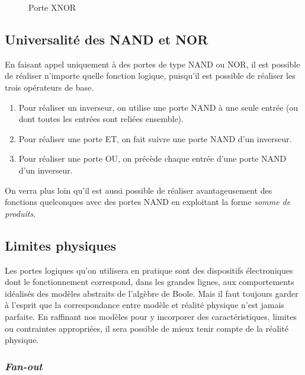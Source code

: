 \documentclass[11pt]{article}
\begin{document}
\begin{figure}[htbp]
\centering

\caption{\label{fig:org3faaf4b}Porte XNOR}
\end{figure}

\subsection{Universalité des NAND et NOR}
\label{sec:org5e187c2}

En faisant appel uniquement à des portes de type NAND ou NOR, il est
possible de réaliser n'importe quelle fonction logique, puisqu'il est
possible de réaliser les trois opérateurs de base.

\begin{enumerate}
\item Pour réaliser un inverseur, on utilise une porte NAND à une seule
entrée (ou dont toutes les entrées sont reliées ensemble).
\item Pour réaliser une porte ET, on fait suivre une porte NAND d'un
inverseur.
\item Pour réaliser une porte OU, on précède chaque entrée d'une porte
NAND d'un inverseur.
\end{enumerate}

On verra plus loin qu'il est aussi possible de réaliser
avantageusement des fonctions quelconques avec des portes NAND en
exploitant la forme \emph{somme de produits}.

\subsection{Limites physiques}
\label{sec:orgfb5af4e}

Les portes logiques qu'on utilisera en pratique sont des dispositifs
électroniques dont le fonctionnement correspond, dans les grandes
lignes, aux comportements idéalisés des modèles abstraits de l'algèbre
de Boole. Mais il faut toujours garder à l'esprit que la
correspondance entre modèle et réalité physique n'est jamais
parfaite. En raffinant nos modèles pour y incorporer des
caractéristiques, limites ou contraintes appropriées, il sera possible
de mieux tenir compte de la réalité physique.

\subsubsection{\emph{Fan-out}}
\label{sec:org144124a}
\end{document}
